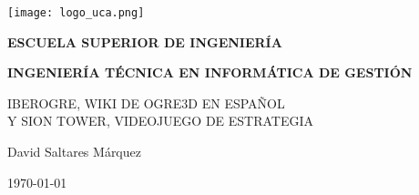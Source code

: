 

\begin{titlepage}

  \begin{center}

    \texttt{[image: logo\_uca.png]} \\
    
    \vspace{2.0cm}
    
    \LARGE{\textbf{ESCUELA SUPERIOR DE INGENIERÍA}} \\
    
    \vspace{1.0cm}
    
    \Large{\textbf{INGENIERÍA TÉCNICA EN INFORMÁTICA DE GESTIÓN}} \\
    
    \vspace{3.0cm}
    
    \Large{IBEROGRE, WIKI DE OGRE3D EN ESPAÑOL\\Y SION TOWER, VIDEOJUEGO DE ESTRATEGIA}\\
    
    \vspace{2.0cm}
    
    \Large{David Saltares Márquez} \\
  
    \vspace{0.5cm}

    \large{\today}
    
  \end{center}
\end{titlepage}
